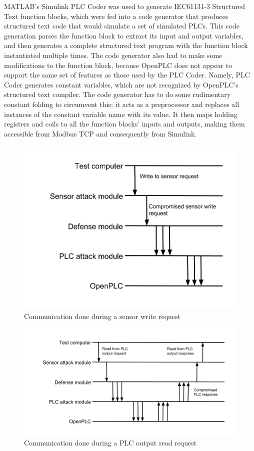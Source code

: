 \documentclass[10pt,twocolumn]{IEEEtran}
\begin{document}
MATLAB's Simulink PLC Coder was used to generate IEC61131-3 Structured Text function blocks, which were fed into a code generator that produces structured text code that would simulate a set of simulated PLCs.
This code generation parses the function block to extract its input and output variables, and then generates a complete structured text program with the function block instantiated multiple times.
The code generator also had to make some modifications to the function block, because OpenPLC does not appear to support the same set of features as those used by the PLC Coder.
Namely, PLC Coder generates constant variables, which are not recognized by OpenPLC's structured text compiler.
The code generator has to do some rudimentary constant folding to circumvent this; it acts as a preprocessor and replaces all instances of the constant variable name with its value.
It then maps holding registers and coils to all the function blocks' inputs and outputs, making them accessible from Modbus TCP and consequently from Simulink.

\begin{figure}
  \centering
  \includegraphics[width=\columnwidth]{csaw2017sensorwrite.png}
  \caption{Communication done during a sensor write request}
  \label{fig:write}
\end{figure}

\begin{figure}
  \centering
  \includegraphics[width=\textwidth]{csaw2017plcread.png}
  \caption{Communication done during a PLC output read request}
  \label{fig:read}
\end{figure}
\end{document}
